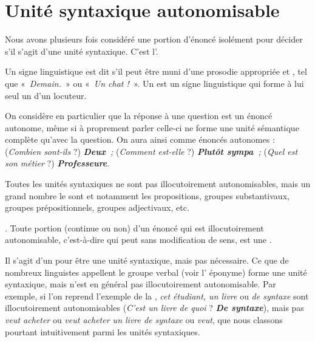 \section{Unité syntaxique autonomisable}\label{sec:3.2.11}

Nous avons plusieurs fois considéré une portion d’énoncé isolément pour décider s’il s’agit d’une unité syntaxique. C’est l’.

{Un signe linguistique est dit  s’il peut être muni d’une prosodie appropriée et , tel que «~\textit{Demain.~}» ou «~\textit{Un chat !~}». Un  est un signe linguistique qui forme à lui seul un  d’un locuteur.}

On considère en particulier que la réponse à une question est un énoncé autonome, même si à proprement parler celle-ci ne forme une unité sémantique complète qu’avec la question. On aura ainsi comme énoncés autonomes : (\textit{Combien sont-ils} ?) \textbf{\textit{Deux~}}\textit{;} (\textit{Comment est-elle} ?) \textbf{\textit{Plutôt sympa~}}\textit{;} (\textit{Quel est son métier} ?) \textbf{\textit{Professeure}}.

\begin{sloppypar}
Toutes les unités syntaxiques ne sont pas illocutoirement autonomisables, mais un grand nombre le sont et notamment les propositions, groupes substantivaux, groupes prépositionnels, groupes adjectivaux, etc.
\end{sloppypar}

{. Toute portion (continue ou non) d’un énoncé qui est illocutoirement autonomisable, c’est-à-dire qui peut  sans modification de sens, est une .}

Il s’agit d’un  pour être une unité syntaxique, mais pas nécessaire. Ce que de nombreux linguistes appellent le groupe verbal (voir l’ éponyme) forme une unité syntaxique, mais n’est en général pas illocutoirement autonomisable. Par exemple, si l’on reprend l’exemple de la , \textit{cet étudiant, un livre} ou \textit{de syntaxe} sont illocutoirement autonomisables (\textit{C’est un livre de quoi} ? \textbf{\textit{De syntaxe}}), mais pas \textit{veut acheter} ou \textit{veut acheter un livre de syntaxe} ou \textit{veut}, que nous classons pourtant intuitivement parmi les unités syntaxiques.

